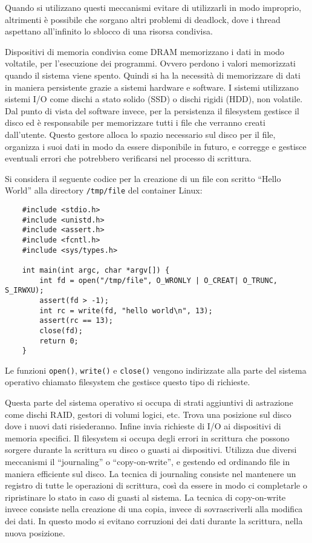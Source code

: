 \documentclass{article}
\numberwithin{equation}{subsection}
\begin{document}
Quando si utilizzano questi meccanismi evitare di utilizzarli in modo improprio, altrimenti è possibile che sorgano altri problemi di deadlock, dove i thread 
aspettano all'infinito lo sblocco di una risorsa condivisa. 


Dispositivi di memoria condivisa come DRAM memorizzano i dati in modo voltatile, per l'esecuzione dei programmi. Ovvero perdono i valori memorizzati quando il sistema 
viene spento. Quindi si ha la necessità di memorizzare di dati in maniera persistente grazie a sistemi hardware e software. I sistemi utilizzano sistemi I/O come 
dischi a stato solido (SSD) o dischi rigidi (HDD), non volatile. Dal punto di vista del software invece, per la persistenza il filesystem gestisce il disco ed è 
responsabile per memorizzare tutti i file che verranno creati dall'utente. Questo gestore alloca lo spazio necessario sul disco per il file, organizza i suoi dati in modo 
da essere disponibile in futuro, e corregge e gestisce eventuali errori che potrebbero verificarsi nel processo di scrittura. 

Si considera il seguente codice per la creazione di un file con scritto ``Hello World'' alla directory \verb|/tmp/file| del container Linux:
\begin{verbatim}
    #include <stdio.h>
    #include <unistd.h>
    #include <assert.h>
    #include <fcntl.h>
    #include <sys/types.h>

    int main(int argc, char *argv[]) {
        int fd = open("/tmp/file", O_WRONLY | O_CREAT| O_TRUNC, S_IRWXU);
        assert(fd > -1);
        int rc = write(fd, "hello world\n", 13);
        assert(rc == 13);
        close(fd);
        return 0;
    }
\end{verbatim}


Le funzioni \verb|open()|, \verb|write()| e \verb|close()| vengono indirizzate alla parte del sistema operativo chiamato filesystem che gestisce questo tipo di richieste.  

Questa parte del sistema operativo si occupa di strati aggiuntivi di astrazione come dischi RAID, gestori di volumi logici, etc. Trova una posizione sul disco dove i nuovi 
dati risiederanno. Infine invia richieste di I/O ai dispositivi di memoria specifici. Il filesystem si occupa degli errori in scrittura che possono sorgere durante la 
scrittura su disco o guasti ai dispositivi. Utilizza due diversi meccanismi il ``journaling'' o ``copy-on-write'', e gestendo ed ordinando file in maniera efficiente sul 
disco. 
La tecnica di journaling consiste nel mantenere un registro di tutte le operazioni di scrittura, così da essere in modo ci completarle o ripristinare lo stato in caso 
di guasti al sistema. 
La tecnica di copy-on-write invece consiste nella creazione di una copia, invece di sovrascriverli alla modifica dei dati. In questo modo si evitano corruzioni dei dati 
durante la scrittura, nella nuova posizione. 
\end{document}
